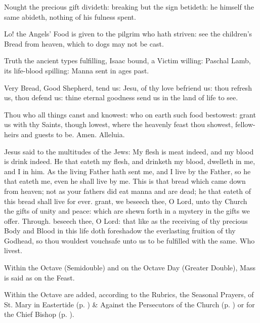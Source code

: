 Nought the precious gift divideth: breaking but the sign betideth: he himself the same abideth, nothing of his fulness spent.\par
Lo! the Angels' Food is given to the pilgrim who hath striven: see the children's Bread from heaven, which to dogs may not be cast.\par
Truth the ancient types fulfilling, Isaac bound, a Victim willing: Paschal Lamb, its life-blood spilling: Manna sent in ages past.\par
Very Bread, Good Shepherd, tend us: Jesu, of thy love befriend us: thou refresh us, thou defend us: thine eternal goodness send us in the land of life to see.\par
Thou who all things canst and knowest: who on earth such food bestowest: grant us with thy Saints, though lowest, where the heavenly feast thou showest, fellow-heirs and guests to be. Amen. Alleluia.

 Jesus said to the multitudes of the Jews: My flesh is meat indeed, and my blood is drink indeed. He that eateth my flesh, and drinketh my blood, dwelleth in me, and I in him. As the living Father hath sent me, and I live by the Father, so he that eateth me, even he shall live by me. This is that bread which came down from heaven; not as your fathers did eat manna and are dead; he that eateth of this bread shall live for ever.
\secret
{} grant, we beseech thee, O Lord, unto thy Church the gifts of unity and peace: which are shewn forth in a mystery in the gifts we offer. Through.
\postcommunion
{} beseech thee, O Lord: that like as the receiving of thy precious Body and Blood in this life doth foreshadow the everlasting fruition of thy Godhead, so thou wouldest vouchsafe unto us to be fulfilled with the same. Who livest.
\begin{rubric}
    Within the Octave (Semidouble) and on the Octave Day (Greater Double), Mass is said as on the Feast.
\end{rubric}
\begin{rubric}
    Within the Octave are added, according to the Rubrics, the Seasonal Prayers,  of St. Mary in Eastertide (p. \pageref{SPMaryInEaster}) \&  Against the Persecutors of the Church (p. \pageref{SPAgainst}) or for the Chief Bishop (p. \pageref{SPChiefBishop}).
\end{rubric}


